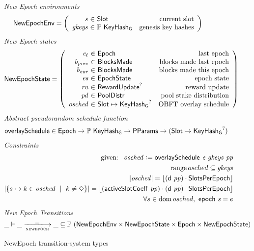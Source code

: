\begin{figure}
  \emph{New Epoch environments}
  \begin{equation*}
    \NewEpochEnv =
    \left(
      \begin{array}{r@{~\in~}lr}
        \var{s} & \Slot & \text{current slot} \\
        \var{gkeys} & \powerset{\KeyHashGen} & \text{genesis key hashes} \\
      \end{array}
    \right)
  \end{equation*}
  \emph{New Epoch states}
  \begin{equation*}
    \NewEpochState =
    \left(
      \begin{array}{r@{~\in~}lr}
        \var{e_\ell} & \Epoch & \text{last epoch} \\
        \var{b_{prev}} & \BlocksMade & \text{blocks made last epoch} \\
        \var{b_{cur}} & \BlocksMade & \text{blocks made this epoch} \\
        \var{es} & \EpochState & \text{epoch state} \\
        \var{ru} & \RewardUpdate^? & \text{reward update} \\
        \var{pd} & \PoolDistr & \text{pool stake distribution} \\
        \var{osched} & \Slot\mapsto\KeyHashGen^? & \text{OBFT overlay schedule} \\
      \end{array}
    \right)
  \end{equation*}
  \emph{Abstract pseudorandom schedule function}
  \begin{align*}
    & \mathsf{overlaySchedule} \in \mathsf{Epoch} \to \mathbb{P}~\mathsf{KeyHash_G} \to \mathsf{PParams}
        \to (\mathsf{Slot}\mapsto\mathsf{KeyHash_G}^?) \\
  \end{align*}
  \emph{Constraints}
  \begin{align*}
    \text{ given: }~\mathit{osched}\mathrel{\mathop:}=\mathsf{overlaySchedule}~\mathit{e}~\mathit{gkeys}~\mathit{pp} \\
    \operatorname{range}{osched}\subseteq\mathit{gkeys} \\
    |\mathit{osched}| = \lfloor(\mathsf{d}~\mathit{pp})\cdot\mathsf{SlotsPerEpoch}\rfloor \\
    |\{s\mapsto k\in\mathit{osched}~\mid~k\neq\Diamond\}| =
    \lfloor(\mathsf{activeSlotCoeff}~ \mathit{pp})\cdot(\mathsf{d}~\mathit{pp})\cdot\mathsf{SlotsPerEpoch}\rfloor \\
    \forall s\in\operatorname{dom}{osched},~\mathsf{epoch}~\mathit{s}=e\\
  \end{align*}
  \emph{New Epoch Transitions}
  \begin{equation*}
    \_ \vdash \var{\_} \trans{newepoch}{\_} \var{\_} \subseteq
    \powerset (\NewEpochEnv \times \NewEpochState \times \Epoch \times \NewEpochState)
  \end{equation*}
  \caption{NewEpoch transition-system types}
  \label{fig:ts-types:newepoch}
\end{figure}

